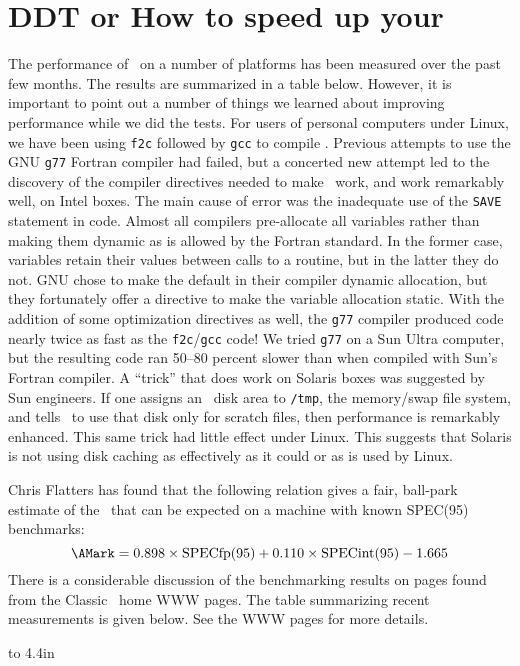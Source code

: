 \section{DDT or How to speed up your \AIPS}

The performance of \AIPS\ on a number of platforms has been measured
over the past few months.  The results are summarized in a table
below.  However, it is important to point out a number of things we
learned about improving performance while we did the tests.  For users
of personal computers under Linux, we have been using {\tt f2c}
followed by {\tt gcc} to compile \hbox{\AIPS}.  Previous attempts to
use the GNU {\tt g77} Fortran compiler had failed, but a
concerted new attempt led to the discovery of the compiler directives
needed to make \AIPS\ work, and work remarkably well, on Intel boxes.
The main cause of error was the inadequate use of the {\tt SAVE}
statement in {\AIPS} code.  Almost all compilers pre-allocate all
variables rather than making them dynamic as is allowed by the Fortran
standard.  In the former case, variables retain their values between
calls to a routine, but in the latter they do not.  GNU chose to make
the default in their compiler dynamic allocation, but they fortunately
offer a directive to make the variable allocation static.  With the
addition of some optimization directives as well, the {\tt g77}
compiler produced code nearly twice as fast as the {\tt f2c}/{\tt gcc}
code!  We tried {\tt g77} on a Sun Ultra computer, but the resulting
code ran 50--80 percent slower than when compiled with Sun's Fortran
compiler.  A ``trick'' that does work on Solaris boxes was suggested
by Sun engineers.  If one assigns an \AIPS\ disk area to {\tt /tmp},
the memory/swap file system, and tells \AIPS\ to use that disk only
for scratch files, then performance is remarkably enhanced.  This same
trick had little effect under Linux.  This suggests that Solaris is
not using disk caching as effectively as it could or as is used by
Linux.

Chris Flatters has found that the following relation gives a fair,
ball-park estimate of the \AMark\ that can be expected on a machine
with known SPEC(95) benchmarks:
$$
 \hbox{\AMark} = 0.898 \times \hbox{SPECfp(95)} + 0.110 \times
\hbox{SPECint(95)} - 1.665
$$
There is a considerable discussion of the benchmarking results on
pages found from the Classic \AIPS\ home WWW pages.  The table
summarizing recent measurements is given below.  See the WWW pages for
more details.
\eject

\begin{center}
\end{center}
\vfill\eject

 \cleardoublepage\pagestyle{empty}
 \centerline{\hss{}\hss}
 \vfill\eject
 \vbox to 4.4in{
 \vfill
 \vfill}
 \phantom{...}
 \centerline{\hss{}\hss}


